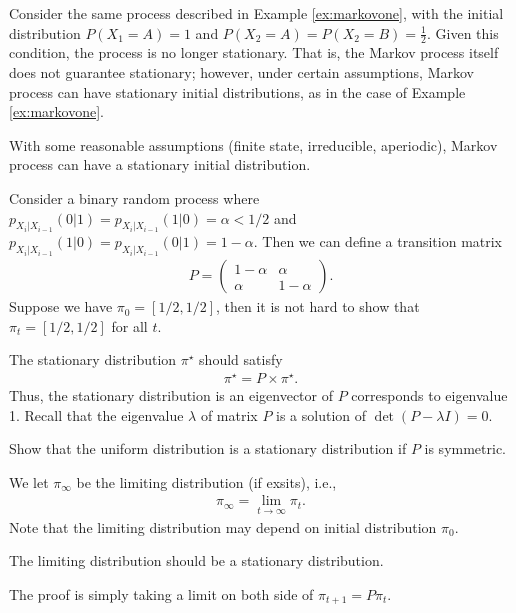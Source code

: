 \documentclass{article}
\begin{document}
\begin{example}
Consider the same process described in Example \ref{ex:markovone}, with the initial distribution $P(X_1=A)=1$ and $P(X_2=A)=P(X_2=B)=\frac{1}{2}$. Given this condition, the process is no longer stationary. That is, the Markov process itself does not guarantee stationary; however, under certain assumptions, Markov process can have stationary initial distributions, as in the case of Example \ref{ex:markovone}.
\end{example}

\begin{theorem}
With some reasonable assumptions (finite state, irreducible, aperiodic), Markov process can have a stationary initial distribution.
\end{theorem}

\begin{example}
    Consider a binary random process where $p_{X_i|X_{i-1}}(0|1)=p_{X_i|X_{i-1}}(1|0) = \alpha<1/2$ and $p_{X_i|X_{i-1}}(1|0)=p_{X_i|X_{i-1}}(0|1) = 1-\alpha$.
    Then we can define a transition matrix
    \begin{align}
        P = \begin{pmatrix}
            1-\alpha & \alpha\\
            \alpha & 1-\alpha
        \end{pmatrix}.
    \end{align}
    Suppose we have $\pi_0 = [1/2, 1/2]$, then it is not hard to show that $\pi_t = [1/2, 1/2]$ for all $t$.
\end{example}

The stationary distribution $\pi^\star$ should satisfy
\begin{align}
    \pi^\star = P \times \pi^\star.
\end{align}
Thus, the stationary distribution is an eigenvector of $P$ corresponds to eigenvalue 1.
Recall that the eigenvalue $\lambda$ of matrix $P$ is a solution of $\det(P-\lambda I)=0$.

\begin{exercise}
    Show that the uniform distribution is a stationary distribution if $P$ is symmetric.
\end{exercise}

We let $\pi_\infty$ be the limiting distribution (if exsits), i.e.,
\begin{align}
    \pi_\infty = \lim_{t\rightarrow \infty} \pi_t.
\end{align}
Note that the limiting distribution may depend on initial distribution $\pi_0$.
\begin{theorem}
    The limiting distribution should be a stationary distribution.
\end{theorem}
The proof is simply taking a limit on both side of $\pi_{t+1} = P \pi_t$.
\end{document}
